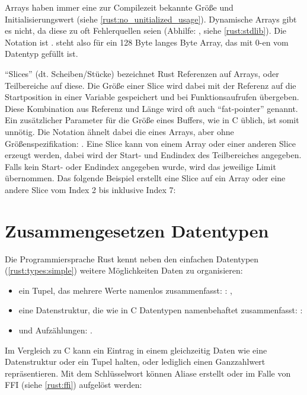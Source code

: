 Arrays haben immer eine zur Compilezeit bekannte Größe und Initialisierungswert (siehe \autoref{rust:no_unitialized_usage}).
Dynamische Arrays gibt es nicht, da diese zu oft Fehlerquellen seien  (Abhilfe: , siehe \autoref{rust:stdlib}).
Die Notation ist .
\rustcinline{[0_u8; 128]} steht also für ein 128 Byte langes Byte Array, das mit 0-en vom Datentyp  gefüllt ist.

\enquote{Slices} (dt. Scheiben/Stücke) bezeichnet Rust Referenzen auf Arrays, oder Teilbereiche auf diese.
Die Größe einer Slice wird dabei mit der Referenz auf die Startposition in einer Variable gespeichert und bei Funktionsaufrufen übergeben.
Diese Kombination aus Referenz und Länge wird oft auch \enquote{fat-pointer} genannt.
Ein zusätzlicher Parameter für die Größe eines Buffers, wie in C üblich, ist somit unnötig.
Die Notation ähnelt dabei die eines Arrays, aber ohne Größenspezifikation: \rustcinline{[<Datentyp>]}.
Eine Slice kann von einem Array oder einer anderen Slice erzeugt werden, dabei wird der Start- und Endindex des Teilbereiches angegeben.
Falls kein Start- oder Endindex angegeben wurde, wird das jeweilige Limit übernommen.
Das folgende Beispiel erstellt eine Slice auf ein Array oder eine andere Slice vom Index 2 bis inklusive Index 7: 

\section{Zusammengesetzen Datentypen}
\label{rust:types:composed}

Die Programmiersprache Rust kennt neben den einfachen Datentypen (\autoref{rust:types:simple}) weitere Möglichkeiten Daten zu organisieren:
\begin{itemize}
	\item ein Tupel, das mehrere Werte namenlos zusammenfasst: : ,
	\item eine Datenstruktur, die wie in C Datentypen namenbehaftet zusammenfasst: \linebreak{}: 
	\item und Aufzählungen: .
\end{itemize}

Im Vergleich zu C kann ein Eintrag in einem  gleichzeitig Daten wie eine Datenstruktur oder ein Tupel halten, oder lediglich einen Ganzzahlwert repräsentieren.
Mit dem  Schlüsselwort können Aliase erstellt oder im Falle von FFI (siehe \autoref{rust:ffi}) aufgelöst werden: 
 
